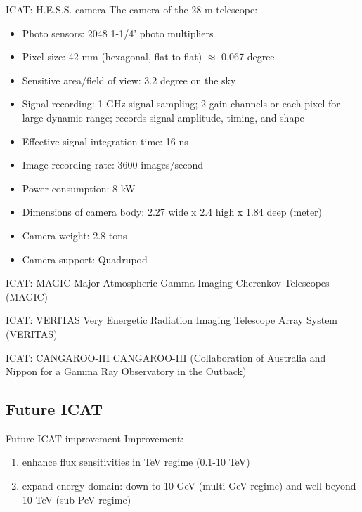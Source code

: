 \documentclass{beamer}
\begin{document}
\begin{frame}{ICAT: H.E.S.S. camera}
	The camera of the 28 m telescope:
	\begin{itemize}
		\item Photo sensors: 2048 1-1/4’ photo multipliers
		\item Pixel size: 42 mm (hexagonal, flat-to-flat) $\approx$ 0.067 degree
		\item Sensitive area/field of view: 3.2 degree on the sky
		\item Signal recording: 1 GHz signal sampling; 2 gain channels or each pixel for large dynamic range; records signal amplitude, timing, and shape
		\item Effective signal integration time: 16 ns
		\item Image recording rate: 3600 images/second
		\item Power consumption: 8 kW
		\item Dimensions of camera body: 2.27 wide x 2.4 high x 1.84 deep (meter)
		\item Camera weight: 2.8 tons
		\item Camera support: Quadrupod
	\end{itemize}
\end{frame}




\begin{frame}{ICAT: MAGIC}
	Major Atmospheric Gamma Imaging Cherenkov Telescopes (MAGIC)
\end{frame}


\begin{frame}{ICAT: VERITAS}
	Very Energetic Radiation Imaging Telescope Array System (VERITAS)
\end{frame}


\begin{frame}{ICAT: CANGAROO-III}
	CANGAROO-III (Collaboration of Australia and Nippon for a Gamma Ray Observatory in the Outback)
\end{frame}

\subsection{Future ICAT}
\begin{frame}{Future ICAT improvement}
	Improvement:
	\begin{enumerate}
		\item enhance flux sensitivities in TeV regime (0.1-10 TeV)
		\item expand energy domain: down to 10 GeV (multi-GeV regime) and well beyond 10 TeV (sub-PeV regime)
	\end{enumerate}
\end{frame}
\end{document}
